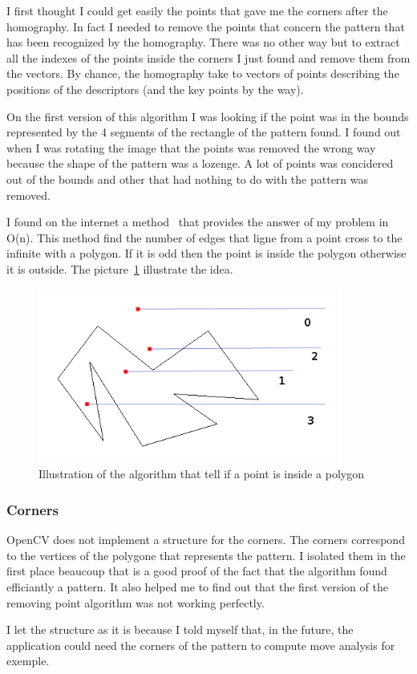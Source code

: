 \documentclass[english,a4paper,11pt]{report}
\begin{document}
	\par I first thought I could get easily the points that gave me the corners after the homography. In fact I needed to remove the points that concern the pattern that has been recognized by the homography. There was no other way but to extract all the indexes of the points inside the corners I just found and remove them from the vectors. By chance, the homography take to vectors of points describing the positions of the descriptors (and the key points by the way). 
	\par On the first version of this algorithm I was looking if the point was in the bounds represented by the 4 segments of the rectangle of the pattern found. I found out when I was rotating the image that the points was removed the wrong way because the shape of the pattern was a lozenge. A lot of points was concidered out of the bounds and other that had nothing to do with the pattern was removed.
	\par I found on the internet a method~\cite{InOut} that provides the answer of my problem in O(n). This method find the number of edges that ligne from a point cross to the infinite with a polygon. If it is odd then the point is inside the polygon otherwise it is outside. The picture~\ref{OutIn} illustrate the idea.
	\begin{figure}[h]
		\begin{center}
			\includegraphics[width=10cm]{images_not_compressed/isIn.png}
			\caption{Illustration of the algorithm that tell if a point is inside a polygon}
			\label{OutIn}	
		\end{center}
	\end{figure}
	\subsubsection{Corners}
	\par OpenCV does not implement a structure for the corners. The corners correspond to the vertices of the polygone that represents the pattern. I isolated them in the first place beaucoup that is a good proof of the fact that the algorithm found efficiantly a pattern. It also helped me to find out that the first version of the removing point algorithm was not working perfectly.
	\par I let the structure as it is because I told myself that, in the future, the application could need the corners of the pattern to compute move analysis for exemple. 	
	
\end{document}
